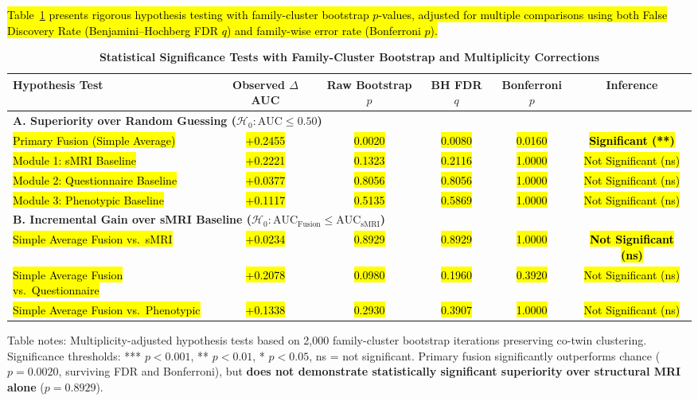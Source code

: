 \documentclass[10pt,letterpaper]{article}
\begin{document}
\hl{Table~\ref{tab:stat_tests} presents rigorous hypothesis testing with family-cluster bootstrap $p$-values, adjusted for multiple comparisons using both False Discovery Rate (Benjamini--Hochberg FDR $q$) and family-wise error rate (Bonferroni $p$).}

\begin{table}[!t]
\begin{adjustwidth}{-2.25in}{0in}
\centering
\caption{\textbf{Statistical Significance Tests with Family-Cluster Bootstrap and Multiplicity Corrections}}
\label{tab:stat_tests}
\footnotesize
\renewcommand{\arraystretch}{1.25}
\begin{tabular}{|l|c|c|c|c|c|}
\hline
\textbf{Hypothesis Test} & \textbf{Observed $\Delta$AUC} & \textbf{Raw Bootstrap $p$} & \textbf{BH FDR $q$} & \textbf{Bonferroni $p$} & \textbf{Inference} \\
\hline
\multicolumn{6}{|l|}{\textbf{A. Superiority over Random Guessing ($\mathcal{H}_0: \text{AUC} \le 0.50$)}} \\
\hline
\hl{Primary Fusion (Simple Average)} & \hl{+0.2455} & \hl{0.0020} & \hl{0.0080} & \hl{0.0160} & \textbf{\hl{Significant (**)}} \\
\hline
\hl{Module 1: sMRI Baseline} & \hl{+0.2221} & \hl{0.1323} & \hl{0.2116} & \hl{1.0000} & \hl{Not Significant (ns)} \\
\hline
\hl{Module 2: Questionnaire Baseline} & \hl{+0.0377} & \hl{0.8056} & \hl{0.8056} & \hl{1.0000} & \hl{Not Significant (ns)} \\
\hline
\hl{Module 3: Phenotypic Baseline} & \hl{+0.1117} & \hl{0.5135} & \hl{0.5869} & \hl{1.0000} & \hl{Not Significant (ns)} \\
\hline
\multicolumn{6}{|l|}{\textbf{B. Incremental Gain over sMRI Baseline ($\mathcal{H}_0: \text{AUC}_{\text{Fusion}} \le \text{AUC}_{\text{sMRI}}$)}} \\
\hline
\hl{Simple Average Fusion vs.\ sMRI} & \hl{+0.0234} & \hl{0.8929} & \hl{0.8929} & \hl{1.0000} & \textbf{\hl{Not Significant (ns)}} \\
\hline
\hl{Simple Average Fusion vs.\ Questionnaire} & \hl{+0.2078} & \hl{0.0980} & \hl{0.1960} & \hl{0.3920} & \hl{Not Significant (ns)} \\
\hline
\hl{Simple Average Fusion vs.\ Phenotypic} & \hl{+0.1338} & \hl{0.2930} & \hl{0.3907} & \hl{1.0000} & \hl{Not Significant (ns)} \\
\hline
\end{tabular}
\begin{flushleft}
Table notes: Multiplicity-adjusted hypothesis tests based on 2,000 family-cluster bootstrap iterations preserving co-twin clustering. Significance thresholds: *** $p < 0.001$, ** $p < 0.01$, * $p < 0.05$, ns = not significant. Primary fusion significantly outperforms chance ($p = 0.0020$, surviving FDR and Bonferroni), but \textbf{does not demonstrate statistically significant superiority over structural MRI alone} ($p = 0.8929$).
\end{flushleft}
\end{adjustwidth}
\end{table}
\end{document}
